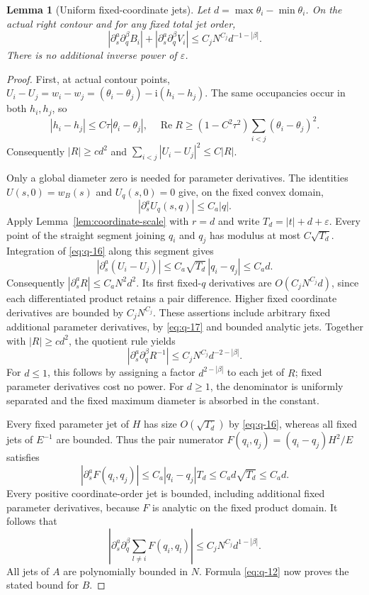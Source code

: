 \documentclass[11pt]{article}
\numberwithin{equation}{section}
\newtheorem{lemma}[theorem]{Lemma}
\theoremstyle{remark}\newtheorem{remark}[theorem]{Remark}
\newcommand{\ii}{\mathrm i}
\newcommand{\Rea}{\operatorname{Re}}
\begin{document}
\begin{lemma}[Uniform fixed-coordinate jets]\label{lem:jets}
Let $d=\max\theta_i-\min\theta_i$. On the actual right contour and
for any fixed total jet order,
\begin{equation}\label{eq:q-14}
|\partial_s^a\partial_q^\beta B_i|
  +|\partial_s^a\partial_q^\beta V_i|
 \le C_j N^{C_j}d^{-1-|\beta|}.
\end{equation}
There is no additional inverse power of $\varepsilon$.
\end{lemma}
\begin{proof}
First, at actual contour points,
$U_i-U_j=w_i-w_j=(\theta_i-\theta_j)-\ii(h_i-h_j)$.
The same occupancies occur in both $h_i,h_j$, so
\begin{equation}\label{eq:q-15}
|h_i-h_j|\le C\tau|\theta_i-\theta_j|,
 \quad \Rea R\ge(1-C^2\tau^2)\sum_{i<j}(\theta_i-\theta_j)^2.
\end{equation}
Consequently $|R|\ge c d^2$ and
$\sum_{i<j}|U_i-U_j|^2\le C|R|$.

Only a global diameter zero is needed for parameter derivatives.
The identities $U(s,0)=w_B(s)$ and $U_q(s,0)=0$ give, on the
fixed convex domain,
\begin{equation}\label{eq:q-16}
 |\partial_s^a U_q(s,q)|\le C_a|q|.
\end{equation}
Apply Lemma~\ref{lem:coordinate-scale} with $r=d$ and write
$T_d=|t|+d+\varepsilon$. Every point of the straight segment
joining $q_i$ and $q_j$ has modulus at most $C\sqrt{T_d}$.
Integration of \eqref{eq:q-16} along this segment gives
\begin{equation}\label{eq:q-17}
 |\partial_s^a(U_i-U_j)|
 \le C_a\sqrt{T_d}\,|q_i-q_j|\le C_a d.
\end{equation}
Consequently $|\partial_s^aR|\le C_aN^2d^2$.
Its first fixed-$q$ derivatives are $O(C_jN^{C_j}d)$, since
each differentiated product retains a pair difference.
Higher fixed coordinate derivatives are bounded by $C_jN^{C_j}$.
These assertions include arbitrary fixed additional parameter
derivatives, by \eqref{eq:q-17} and bounded analytic jets.
Together with $|R|\ge cd^2$, the quotient rule yields
\[
 |\partial_s^a\partial_q^\beta R^{-1}|
       \le C_jN^{C_j}d^{-2-|\beta|}.
\]
For $d\le1$, this follows by assigning a factor
$d^{2-|\beta|}$ to each jet of $R$; fixed parameter derivatives
cost no power. For $d\ge1$, the denominator is uniformly
separated and the fixed maximum diameter is absorbed in the constant.

Every fixed parameter jet of $H$ has size $O(\sqrt{T_d})$ by
\eqref{eq:q-16}, whereas all fixed jets of $E^{-1}$ are bounded.
Thus the pair numerator $F(q_i,q_j)=(q_i-q_j)H^2/E$ satisfies
\[
 |\partial_s^aF(q_i,q_j)|
 \le C_a|q_i-q_j|T_d\le C_a d\sqrt{T_d}\le C_a d.
\]
Every positive coordinate-order jet is bounded, including
additional fixed parameter derivatives, because $F$ is analytic
on the fixed product domain. It follows that
\[
 |\partial_s^a\partial_q^\beta\sum_{l\ne i}F(q_i,q_l)|
       \le C_jN^{C_j}d^{1-|\beta|}.
\]
All jets of $A$ are polynomially bounded in $N$.
Formula \eqref{eq:q-12} now proves the stated bound for $B$.


\end{proof}
\end{document}

